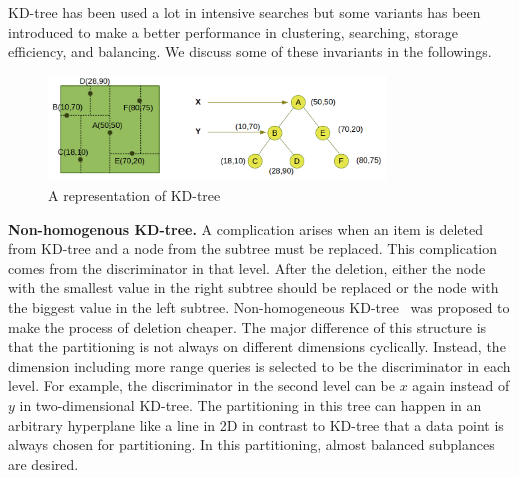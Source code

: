 \documentclass[a4paper,12pt]{article}
\begin{document}
KD-tree has been used a lot in intensive searches but some variants has been introduced to make a better performance in clustering, searching, storage efficiency,  
and balancing. We discuss some of these invariants in the followings.

\begin{figure}
\centering
\includegraphics[width=0.8\textwidth]{kd-Tree}
\caption{A representation of KD-tree}
\label{figkdtree}
\end{figure}


\textbf{Non-homogenous KD-tree.}
A complication arises when an item is deleted from KD-tree and a node from the subtree must be replaced. This complication comes from the discriminator in that level. After the deletion, either the node with the smallest value in the right subtree should be replaced or the node with the biggest value in the left subtree. Non-homogeneous KD-tree~\cite{nonhomkdtree} was proposed to make the process of deletion cheaper. The major difference of this structure is that the partitioning is not always on different dimensions cyclically. Instead, the dimension including more range queries is selected to be the discriminator in each level. For example, the discriminator in the second level can be $x$ again instead of $y$ in two-dimensional KD-tree. 
The partitioning in this tree can happen in an arbitrary hyperplane like a line in 2D in contrast to KD-tree that a data point is always chosen for partitioning. In this partitioning, almost balanced subplances are desired.
 
\end{document}

